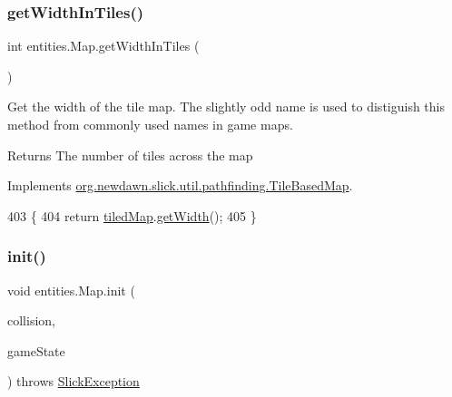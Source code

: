 \subsubsection{\texorpdfstring{get\+Width\+In\+Tiles()}{getWidthInTiles()}}
{\footnotesize\ttfamily int entities.\+Map.\+get\+Width\+In\+Tiles (\begin{DoxyParamCaption}{ }\end{DoxyParamCaption})\hspace{0.3cm}{\ttfamily [inline]}}

Get the width of the tile map. The slightly odd name is used to distiguish this method from commonly used names in game maps.

\begin{DoxyReturn}{Returns}
The number of tiles across the map 
\end{DoxyReturn}


Implements \mbox{\hyperlink{interfaceorg_1_1newdawn_1_1slick_1_1util_1_1pathfinding_1_1_tile_based_map_a5efac540b233405c4ae65b784a7c6d22}{org.\+newdawn.\+slick.\+util.\+pathfinding.\+Tile\+Based\+Map}}.


\begin{DoxyCode}
403                                  \{
404         \textcolor{keywordflow}{return} \mbox{\hyperlink{classentities_1_1_map_a94a743ccd80946422fcbdb5ba1cc966b}{tiledMap}}.\mbox{\hyperlink{classorg_1_1newdawn_1_1slick_1_1tiled_1_1_tiled_map_a1a8a716864f741b9f788138407108eb3}{getWidth}}();
405     \}
\end{DoxyCode}
\mbox{\label{classentities_1_1_map_a183d1b160c442fc50c37cf0cb956f5cd}} 
\subsubsection{\texorpdfstring{init()}{init()}}
{\footnotesize\ttfamily void entities.\+Map.\+init (\begin{DoxyParamCaption}\item[{\mbox{\hyperlink{classentities_1_1_collision_handler}{Collision\+Handler}}}]{collision,  }\item[{\mbox{\hyperlink{classstates_1_1_game_state}{Game\+State}}}]{game\+State }\end{DoxyParamCaption}) throws \mbox{\hyperlink{classorg_1_1newdawn_1_1slick_1_1_slick_exception}{Slick\+Exception}}\hspace{0.3cm}{\ttfamily [inline]}}

